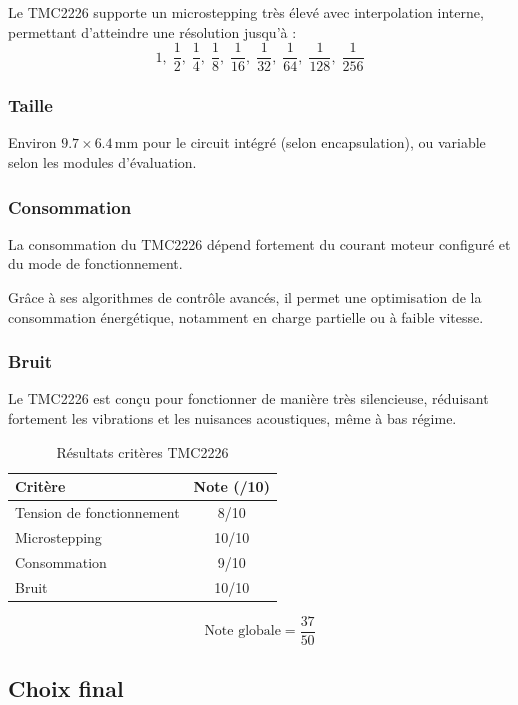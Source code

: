 Le TMC2226 supporte un microstepping très élevé avec interpolation interne, permettant d'atteindre une résolution jusqu'à :
$$
1,\; \frac{1}{2},\; \frac{1}{4},\; \frac{1}{8},\; \frac{1}{16},\; \frac{1}{32},\; \frac{1}{64},\; \frac{1}{128},\; \frac{1}{256}
$$

\subsubsection{Taille}

Environ $9.7 \times 6.4\,\mathrm{mm}$ pour le circuit intégré (selon encapsulation), ou variable selon les modules d'évaluation.

\subsubsection{Consommation}

La consommation du TMC2226 dépend fortement du courant moteur configuré et du mode de fonctionnement.

Grâce à ses algorithmes de contrôle avancés, il permet une optimisation de la consommation énergétique, notamment en charge partielle ou à faible vitesse.

\subsubsection{Bruit}

Le TMC2226 est conçu pour fonctionner de manière très silencieuse, réduisant fortement les vibrations et les nuisances acoustiques, même à bas régime.
\begin{table}[H]
    \centering
    \begin{tabular}{|l|c|}
        \hline
        \textbf{Critère} & \textbf{Note (/10)} \\
        \hline
        Tension de fonctionnement & 8/10 \\
        \hline
        Microstepping & 10/10 \\
        \hline
        Consommation & 9/10 \\
        \hline
        Bruit & 10/10 \\
        \hline
    \end{tabular}
    \caption{Résultats critères TMC2226}
    \label{tab:tmc2226_resultats}
\end{table}

$$
\text{Note globale} = \frac{37}{50}
$$


\subsection{Choix final}


